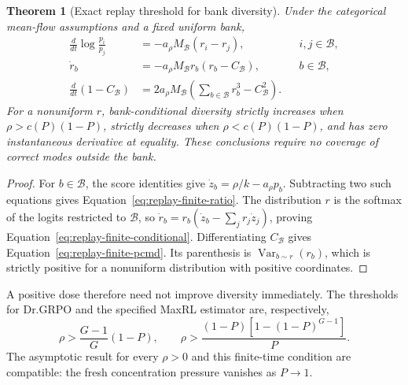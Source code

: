 \documentclass{article}
\newcommand{\enforcehalffinalproseline}{%
  \setlength{\parfillskip}{0pt plus .20\linewidth}}
\newcommand{\1}{\mathbf 1}
\newtheorem{theorem}[lemma]{Theorem}
\theoremstyle{remark}
\theoremstyle{definition}
\theoremstyle{plain}
\begin{document}
\begin{theorem}[Exact replay threshold for bank diversity]
\enforcehalffinalproseline
\label{thm:replay-finite-threshold}
Under the categorical mean-flow assumptions and a fixed uniform bank,
\begin{align}
 \frac{d}{dt}\log\frac{p_i}{p_j}
  &=-a_\rho M_{\mathcal B}(r_i-r_j),
   &&i,j\in\mathcal B,\label{eq:replay-finite-ratio}\\
 \dot r_b&=-a_\rho M_{\mathcal B}r_b(r_b-C_{\mathcal B}),
   &&b\in\mathcal B,\label{eq:replay-finite-conditional}\\
 \frac{d}{dt}(1-C_{\mathcal B})
  &=2a_\rho M_{\mathcal B}
    \left(\sum_{b\in\mathcal B}r_b^3-C_{\mathcal B}^2\right).
 \label{eq:replay-finite-pcmd}
\end{align}
For a nonuniform $r$, bank-conditional diversity strictly increases when
$\rho>c(P)(1-P)$, strictly decreases when $\rho<c(P)(1-P)$, and has zero
instantaneous derivative at equality. These conclusions require no coverage
of correct modes outside the bank.
\end{theorem}

\begin{proof}
\enforcehalffinalproseline
For $b\in\mathcal B$, the score identities give
$\dot z_b=\rho/k-a_\rho p_b$. Subtracting two such equations gives
Equation~\eqref{eq:replay-finite-ratio}. The distribution $r$ is the softmax
of the logits restricted to $\mathcal B$, so
$\dot r_b=r_b(\dot z_b-\sum_jr_j\dot z_j)$, proving
Equation~\eqref{eq:replay-finite-conditional}. Differentiating
$C_{\mathcal B}$ gives Equation~\eqref{eq:replay-finite-pcmd}.
Its parenthesis is $\operatorname{Var}_{b\sim r}(r_b)$, which is strictly
positive for a nonuniform distribution with positive coordinates.
\end{proof}

A positive dose therefore need not improve diversity immediately.
The thresholds for Dr.GRPO and the specified MaxRL estimator are, respectively,
\[
 \rho>\frac{G-1}{G}(1-P),\qquad
 \rho>\frac{(1-P)[1-(1-P)^{G-1}]}{P}.
\]
The asymptotic result for every $\rho>0$ and this finite-time condition are
compatible: the fresh concentration pressure vanishes as $P\to1$.
\end{document}
